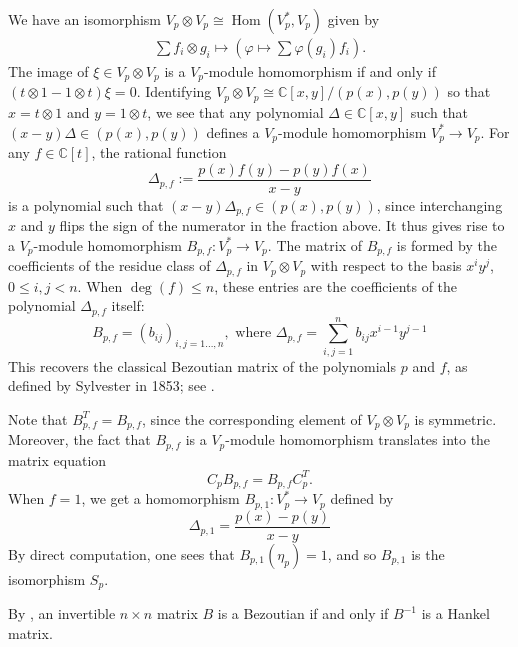 \documentclass[11pt]{article}
\theoremstyle{definition}
\theoremstyle{plain}
\theoremstyle{remark}
\newcommand{\numberset}{\mathbb}
\newcommand{\C}{\numberset{C}}
\DeclareMathOperator{\Hom}{Hom}
\begin{document}
        We have an isomorphism $V_p \otimes V_p \cong \Hom(V_p^*,V_p)$ given by
        \begin{align*}
            \sum f_i \otimes g_i \longmapsto \left(
            \varphi \mapsto \sum \varphi(g_i)f_i\right).
        \end{align*}
        The image of $\xi \in V_p \otimes V_p$ is a $V_p$-module homomorphism if and only if $(t \otimes 1 - 1 \otimes t)\xi = 0$. Identifying $V_p \otimes V_p \cong \C[x,y]/(p(x),p(y))$ so that $x = t \otimes 1$ and $y = 1 \otimes t$, we see that any polynomial $\Delta \in \C[x,y]$ such that $(x-y)\Delta \in (p(x),p(y))$ defines a $V_p$-module homomorphism $V_p^* \to V_p$. For any $f \in \C[t]$, the rational function
        \begin{equation}\label{eq-bez_def}
            \Delta_{p,f} := \frac{p(x)f(y)-p(y)f(x)}{x-y}
        \end{equation}
        is a polynomial such that $(x-y)\Delta_{p,f} \in (p(x),p(y))$, since interchanging $x$ and $y$ flips the sign of the numerator in the fraction above. It thus gives rise to a $V_p$-module homomorphism $B_{p,f}\colon V_p^* \to V_p$. The matrix of $B_{p,f}$ is formed by the coefficients of the residue class of $\Delta_{p,f}$ in $V_p \otimes V_p$ with respect to the basis $x^iy^j$, $0 \leq i,j < n$. When $\deg(f) \leq n$, these entries are the coefficients of the polynomial $\Delta_{p,f}$ itself:
        \begin{equation}\label{eq-bez_matrix_def}
            B_{p,f} = (b_{ij})_{i,j=1\dots,n}, \text{ where } \Delta_{p,f} = \sum_{i,j=1}^{n}b_{ij}x^{i-1}y^{j-1}
        \end{equation}
        This recovers the classical Bezoutian matrix of the polynomials $p$ and $f$, as defined by Sylvester in 1853; see \cite{Sylvester1853}.
        
        Note that $B_{p,f}^T=B_{p,f}$, since the corresponding element of $V_p \otimes V_p$ is symmetric. Moreover, the fact that $B_{p,f}$ is a $V_p$-module homomorphism translates into the matrix equation
        \[
            C_pB_{p,f} = B_{p,f}C_p^T.
        \]
        When $f=1$, we get a homomorphism $B_{p,1}\colon V_p^* \to V_p$ defined by
        \[
            \Delta_{p,1} = \frac{p(x) - p(y)}{x-y}
        \]
        By direct computation, one sees that $B_{p,1}(\eta_p) = 1$, and so $B_{p,1}$ is the isomorphism $S_p$.

        \begin{rmk}
            By \cite{HeinigRost}, an invertible $n \times n$ matrix $B$ is a Bezoutian if and only if $B^{-1}$ is a Hankel matrix.
        \end{rmk} 
\end{document}
